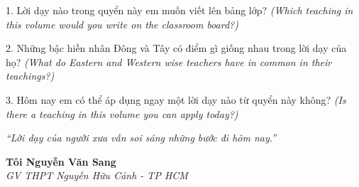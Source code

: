 \begin{tcolorbox}[
  colback=truyengold!10, colframe=truyengold!70!black,
  coltitle=black, fonttitle=\bfseries,
  title={T\textit{ự} H\textit{ọ}c Nhanh},
  arc=4pt, boxrule=1pt, breakable, enhanced
]
1. Lời dạy nào trong quyển này em muốn viết lên bảng lớp? \textit{(Which teaching in this volume would you write on the classroom board?)}

2. Những bậc hiền nhân Đông và Tây có điểm gì giống nhau trong lời dạy của họ? \textit{(What do Eastern and Western wise teachers have in common in their teachings?)}

3. Hôm nay em có thể áp dụng ngay một lời dạy nào từ quyển này không? \textit{(Is there a teaching in this volume you can apply today?)}
\end{tcolorbox}

\begin{center}
\textit{\color{truyengold}``Lời dạy của người xưa vẫn soi sáng những bước đi hôm nay.''}
\end{center}

\begin{flushright}
\textbf{Tôi Nguyễn Văn Sang}\\
\textit{GV THPT Nguyễn Hữu Cảnh - TP HCM}
\end{flushright}

\ngancach
